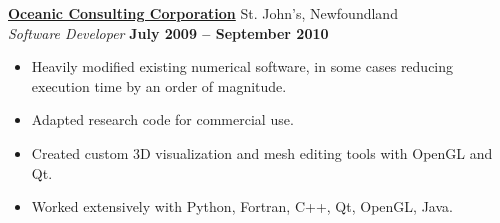 \documentclass[margin,line]{res}
\begin{document}
\begin{resume}
	\href{http://www.oceaniccorp.com}{\bf Oceanic Consulting Corporation} {\hfill St. John's, Newfoundland}\\
      {\em Software Developer} \hfill {\bf July 2009 -- September 2010}
      \begin{itemize} \itemsep -2pt
        \item Heavily modified existing numerical software, in some cases reducing execution time by an order of magnitude.
        \item Adapted research code for commercial use.
        \item Created custom 3D visualization and mesh editing tools with OpenGL and Qt.
        \item Worked extensively with Python, Fortran, C++, Qt, OpenGL, Java.
      \end{itemize}



                

\end{resume}
\end{document}
